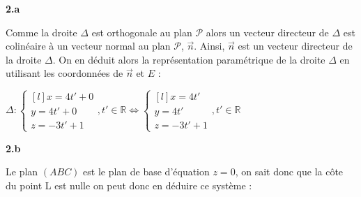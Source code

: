 \documentclass{article}
\begin{document}
\vspace{2mm}

\textbf{2.a}

\vspace{2mm}

\noindent Comme la droite $\Delta$ est orthogonale au plan $\mathscr{P}$ alors un vecteur directeur de $\Delta$ est colinéaire à un vecteur normal au plan $\mathscr{P}$, $\overrightarrow{n}$. Ainsi, $\overrightarrow{n}$ est un vecteur directeur de la droite $\Delta$. On en déduit alors la représentation paramétrique de la droite $\Delta$ en utilisant les coordonnées de $\overrightarrow{n}$ et $E$ :

\vspace{2mm}

$\Delta:\left\{\begin{matrix*}[l]
x = 4t'+ 0\\
y = 4t'+ 0\\
z = -3t'+ 1
\end{matrix*}
\right., t' \in \mathbb{R}
\Leftrightarrow \left\{\begin{matrix*}[l]
x = 4t'\\
y = 4t'\\
z = -3t'+ 1
\end{matrix*}
\right., t' \in \mathbb{R}
$

\vspace{2mm}

\textbf{2.b}

\vspace{2mm}

\noindent Le plan $(ABC)$ est le plan de base d'équation $z = 0$, on sait donc que la côte du point L est nulle on peut donc en déduire ce système :

\vspace{2mm}
\end{document}
